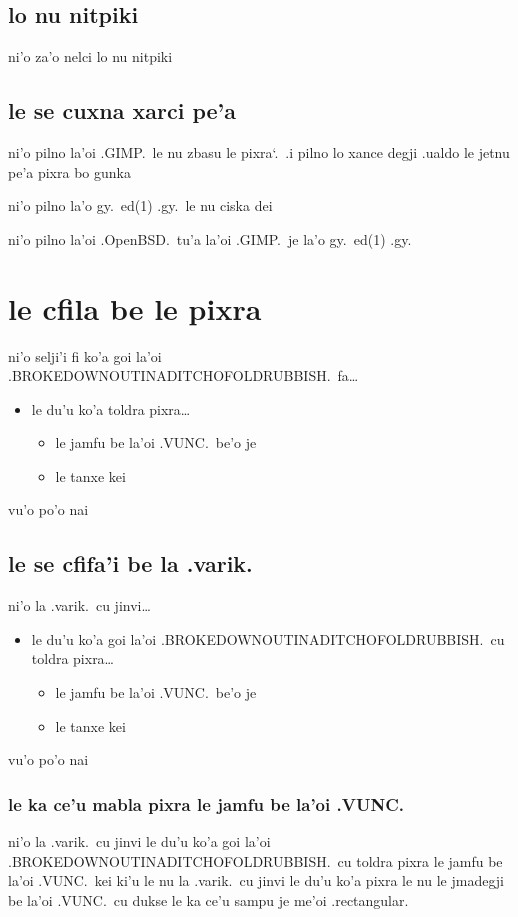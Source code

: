 \documentclass{report}
\newcommand\sds{\spacefactor\sfcode`.\ \space}
\begin{document}
\subsection{lo nu nitpiki}
ni'o za'o nelci lo nu nitpiki

\subsection{le se cuxna xarci pe'a}
ni'o pilno la'oi .GIMP.\ le nu zbasu le pixra\sds  .i pilno lo xance degji .ualdo le jetnu pe'a pixra bo gunka

ni'o pilno la'o gy.\ ed(1) .gy.\ le nu ciska dei

ni'o pilno la'oi .OpenBSD.\ tu'a la'oi .GIMP.\ je la'o gy.\ ed(1) .gy.

\section{le cfila be le pixra}
ni'o selji'i fi ko'a goi la'oi .BROKEDOWNOUTINADITCHOFOLDRUBBISH.\ fa\ldots
\begin{itemize}
	\item le du'u ko'a toldra pixra\ldots
	\begin{itemize}
		\item le jamfu be la'oi .VUNC.\ be'o je
		\item le tanxe kei
	\end{itemize}
\end{itemize}
vu'o po'o nai

\subsection{le se cfifa'i be la .varik.}
ni'o la .varik.\ cu jinvi\ldots
\begin{itemize}
	\item le du'u ko'a goi la'oi .BROKEDOWNOUTINADITCHOFOLDRUBBISH.\ cu toldra pixra\ldots
	\begin{itemize}
		\item le jamfu be la'oi .VUNC.\ be'o je
		\item le tanxe kei
	\end{itemize}
\end{itemize}
vu'o po'o nai

\subsubsection{le ka ce'u mabla pixra le jamfu be la'oi .VUNC.}
ni'o la .varik.\ cu jinvi le du'u ko'a goi la'oi .BROKEDOWNOUTINADITCHOFOLDRUBBISH.\ cu toldra pixra le jamfu be la'oi .VUNC.\ kei ki'u le nu la .varik.\ cu jinvi le du'u ko'a pixra le nu le jmadegji be la'oi .VUNC.\ cu dukse le ka ce'u sampu je me'oi .rectangular.
\end{document}
